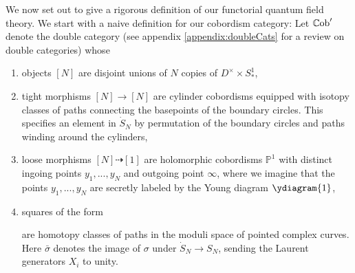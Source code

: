 \documentclass[11pt]{report}
\theoremstyle{definition}
\theoremstyle{remark}
\theoremstyle{remark}
\newcommand{\id}{\textnormal{id}}
\renewcommand{\P}{\mathbb{P}}
\begin{document}
We now set out to give a rigorous definition of our functorial quantum field theory. We start with a naive definition for our cobordism category: Let $\mathbb{C}\textnormal{ob}'$ denote the double category (see appendix \ref{appendix:doubleCats} for a review on double categories) whose
\begin{enumerate}[label=(\roman*)]
\item objects $[N]$ are disjoint unions of $N$ copies of $D^\times \times S_*^1$,%
\item tight morphisms $[N] \longrightarrow [N]$ are cylinder cobordisms equipped with isotopy classes of paths connecting the basepoints of the boundary circles. This specifies an element in $\dot S_N$ by permutation of the boundary circles and paths winding around the cylinders,
\item loose morphisms $[N] \dashrightarrow [1]$ are holomorphic cobordisms $\P^1$ with distinct ingoing points $y_1,...,y_N$ and outgoing point $\infty$, where we imagine that the points $y_1,...,y_N$ are secretly labeled by the Young diagram $\ydiagram{1}$,
\item squares of the form
\begin{center}
\end{center}
are homotopy classes of paths in the moduli space of pointed complex curves. Here $\bar \sigma$ denotes the image of $\sigma$ under $\dot S_N \to S_N$, sending the Laurent generators $X_i$ to unity.
\end{enumerate}
\end{document}
